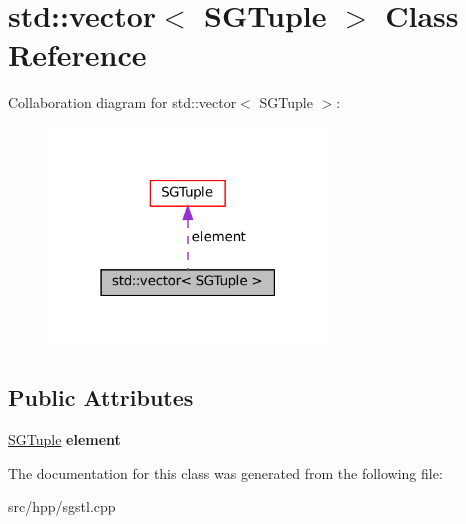 \hypertarget{classstd_1_1vector_3_01SGTuple_01_4}{}\section{std\+:\+:vector$<$ S\+G\+Tuple $>$ Class Reference}
\label{classstd_1_1vector_3_01SGTuple_01_4}


Collaboration diagram for std\+:\+:vector$<$ S\+G\+Tuple $>$\+:
\nopagebreak
\begin{figure}[H]
\begin{center}
\leavevmode
\includegraphics[width=210pt]{classstd_1_1vector_3_01SGTuple_01_4__coll__graph}
\end{center}
\end{figure}
\subsection*{Public Attributes}
\begin{DoxyCompactItemize}
\item 
\mbox{\label{classstd_1_1vector_3_01SGTuple_01_4_a001da85b9f9ebaba0cc184fbd0f73f5a}} 
\hyperlink{classSGTuple}{S\+G\+Tuple} {\bfseries element}
\end{DoxyCompactItemize}


The documentation for this class was generated from the following file\+:\begin{DoxyCompactItemize}
\item 
src/hpp/sgstl.\+cpp\end{DoxyCompactItemize}
